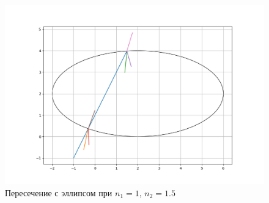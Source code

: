 {	\begin{figure}[H]
		\includegraphics[width=0.7\pagewidth]{ell_intersect2}
		\caption{Пересечение с эллипсом при $n_1 = 1$, $n_2 = 1.5$}
		\label{ell_intersect2}
	\end{figure}
	
%	
%	
%	
%	
%	
}

\newpage

\titleformat{\section}{\large\bfseries\centering}{\thesection}{0.5em}{\MakeUppercase}
\titleformat{\subsection}[block]{\bfseries\hspace{1em}}{\thesubsection}{0.5em}{}

